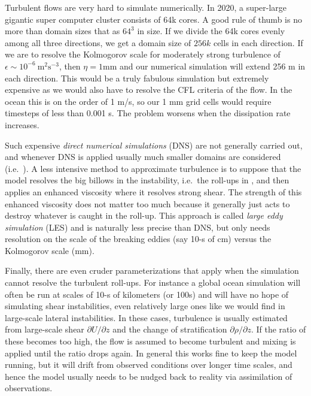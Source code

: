 \documentclass[11pt]{article}
\begin{document}
Turbulent flows are very hard to simulate numerically.  In 2020, a super-large gigantic super computer cluster consists of 64k cores.  A good rule of thumb is no more than domain sizes that as $64^3$ in size.  If we divide the 64k cores evenly among all three directions, we get a domain size of $256k$ cells in each direction.   If we are to resolve the Kolmogorov scale for moderately strong turbulence of $\epsilon \sim 10^{-6}\ \mathrm{m^2s^{-3}}$, then $\eta =  1 \mathrm{mm}$ and our numerical simulation will extend 256 m in each direction.  This would be a truly fabulous simulation but extremely expensive as we would also have to resolve the CFL criteria of the flow.  In the ocean this is on the order of 1 m/s, so our 1 mm grid cells would require timesteps of less than 0.001 s.  The problem worsens when the dissipation rate increases.  

Such expensive \emph{direct numerical simulations} (DNS) are not generally carried out, and whenever DNS is applied usually much smaller domains are considered (i.e.\ ).  A less intensive method to approximate turbulence is to suppose that the model resolves the big billows in the instability, i.e.\ the roll-ups in , and then applies an enhanced viscosity where it resolves strong shear.  The strength of this enhanced viscosity does not matter too much because it generally just acts to destroy whatever is caught in the roll-up.  This approach is called \emph{large eddy simulation} (LES) and is naturally less precise than DNS, but only needs resolution on the scale of the breaking eddies (say 10-s of cm) versus the Kolmogorov scale (mm).  

Finally, there are even cruder parameterizations that apply when the simulation cannot resolve the turbulent roll-ups.  For instance a global ocean simulation will often be run at scales of 10-s of kilometers (or 100s) and will have no hope of simulating shear instabilities, even relatively large ones like we would find in large-scale lateral instabilities.  In these cases, turbulence is usually estimated from large-scale shear $\partial U / \partial z$ and the change of stratification $\partial \rho / \partial z$.  If the ratio of these becomes too high, the flow is assumed to become turbulent and mixing is applied until the ratio drops again.  In general this works fine to keep the model running, but it will drift from observed conditions over longer time scales, and hence the model usually needs to be nudged back to reality via assimilation of observations.   



\end{document}
